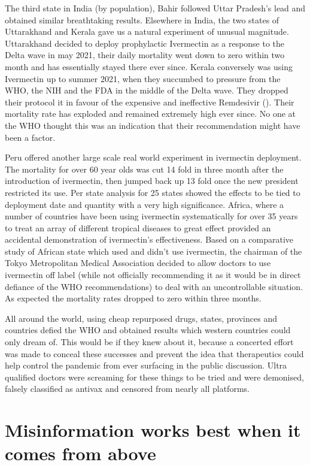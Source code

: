\documentclass[11pt,a4paper]{article}
\begin{document}
The third state in India (by population), Bahir followed Uttar Pradesh’s lead and obtained similar breathtaking results. Elsewhere in India, the two states of Uttarakhand and Kerala gave us a natural experiment of unusual magnitude. Uttarakhand decided to deploy prophylactic Ivermectin as a response to the Delta wave in may 2021, their daily mortality went down to zero within two month and has essentially stayed there ever since. Kerala conversely was using Ivermectin up to summer 2021, when they succumbed to pressure from the WHO, the NIH and the FDA in the middle of the Delta wave. They dropped their protocol it in favour of the expensive and ineffective Remdesivir (\cite{Bose2021-xv}). Their mortality rate has exploded and remained extremely high ever since. No one at the WHO thought this was an indication that their recommendation might have been a factor.   

Peru offered another large scale real world experiment in ivermectin deployment. The mortality for over 60 year olds was cut 14 fold in three month after the introduction of ivermectin, then jumped back up 13 fold once the new president restricted its use. Per state analysis for 25 states showed the effects to be tied to deployment date and quantity with a very high significance. Africa, where a number of countries have been using ivermectin systematically for over 35 years to treat an array of different tropical diseases to great effect provided an accidental demonstration of ivermectin’s effectiveness. Based on a comparative study of African state which used and didn’t use ivermectin, the chairman of the Tokyo Metropolitan Medical Association decided to allow doctors to use ivermectin off label (while not officially recommending it as it would be in direct defiance of the WHO recommendations) to deal with an uncontrollable situation. As expected the mortality rates dropped to zero within three months.

All around the world, using cheap repurposed drugs, states, provinces and countries defied the WHO and obtained results which western countries could only dream of. This would be if they knew about it, because a concerted effort was made to conceal these successes and prevent the idea that therapeutics could help control the pandemic from ever surfacing in the public discussion. Ultra qualified doctors were screaming for these things to be tried and were demonised, falsely classified as antivax and censored from nearly all platforms. 

\section*{Misinformation works best when it comes from above}
\end{document}
